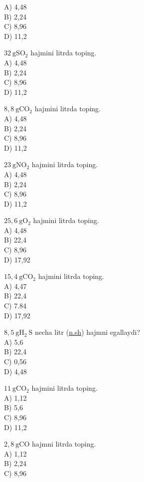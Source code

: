 A) 4,48\\
B) 2,24\\
C) 8,96\\
D) 11,2
  \item $32 \mathrm{~g} \mathrm{SO}_{2}$ hajmini litrda toping.\\
A) 4,48\\
B) 2,24\\
C) 8,96\\
D) 11,2
  \item $8,8 \mathrm{~g} \mathrm{CO}_{2}$ hajmini litrda toping.\\
A) 4,48\\
B) 2,24\\
C) 8,96\\
D) 11,2
  \item $23 \mathrm{~g} \mathrm{NO}_{2}$ hajmini litrda toping.\\
A) 4,48\\
B) 2,24\\
C) 8,96\\
D) 11,2
  \item $25,6 \mathrm{~g} \mathrm{O}_{2}$ hajmini litrda toping.\\
A) 4,48\\
B) 22,4\\
C) 8,96\\
D) 17,92
  \item $15,4 \mathrm{~g} \mathrm{CO}_{2}$ hajmini litrda toping.\\
A) 4,47\\
B) 22,4\\
C) 7.84\\
D) 17,92
  \item $8,5 \mathrm{~g} \mathrm{H}_{2} \mathrm{~S}$ necha litr (\href{http://n.sh}{n.sh}) hajmni egallaydi?\\
A) 5,6\\
B) 22,4\\
C) 0,56\\
D) 4,48
  \item $11 \mathrm{~g} \mathrm{CO}_{2}$ hajmini litrda toping.\\
A) 1,12\\
B) 5,6\\
C) 8,96\\
D) 11,2
  \item $2,8 \mathrm{~g} \mathrm{CO}$ hajmni litrda toping.\\
A) 1,12\\
B) 2,24\\
C) 8,96\\
